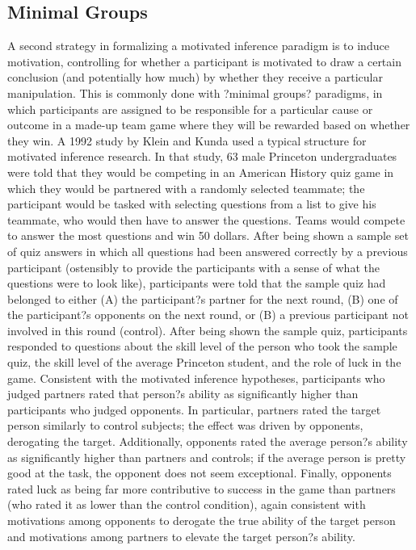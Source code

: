 \documentclass{article}
\begin{document}
\subsection{Minimal Groups}
A second strategy in formalizing a motivated inference paradigm is to induce motivation, controlling for whether a participant is motivated to draw a certain conclusion (and potentially how much) by whether they receive a particular manipulation. This is commonly done with ?minimal groups? paradigms, in which participants are assigned to be responsible for a particular cause or outcome in a made-up team game where they will be rewarded based on whether they win. A 1992 study by Klein and Kunda used a typical structure for motivated inference research. In that study, 63 male Princeton undergraduates were told that they would be competing in an American History quiz game in which they would be partnered with a randomly selected teammate; the participant would be tasked with selecting questions from a list to give his teammate, who would then have to answer the questions. Teams would compete to answer the most questions and win 50 dollars. After being shown a sample set of quiz answers in which all questions had been answered correctly by a previous participant (ostensibly to provide the participants with a sense of what the questions were to look like), participants were told that the sample quiz had belonged to either (A) the participant?s partner for the next round, (B) one of the participant?s opponents on the next round, or (B) a previous participant not involved in this round (control). After being shown the sample quiz, participants responded to questions about the skill level of the person who took the sample quiz, the skill level of the average Princeton student, and the role of luck in the game. 
Consistent with the motivated inference hypotheses, participants who judged partners rated that person?s ability as significantly higher than participants who judged opponents. In particular, partners rated the target person similarly to control subjects; the effect was driven by opponents, derogating the target. Additionally, opponents rated the average person?s ability as significantly higher than partners and controls; if the average person is pretty good at the task, the opponent does not seem exceptional. Finally, opponents rated luck as being far more contributive to success in the game than partners (who rated it as lower than the control condition), again consistent with motivations among opponents to derogate the true ability of the target person and motivations among partners to elevate the target person?s ability.  
\end{document}
